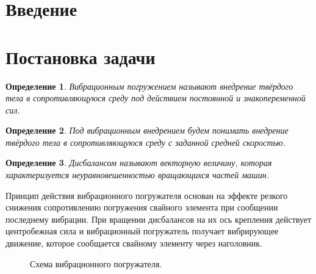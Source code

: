 \documentclass[14pt, a4paper]{extarticle}
\newtheorem{definition}{Определение}
\begin{document}
    \renewcommand\contentsname{Оглавление} %
    \tableofcontents
    \setcounter{page}{2}

    \pagebreak
    \section*{Введение}


    \clearpage
    \section{Постановка задачи}
    \begin{definition}
        Вибрационным погружением называют внедрение твёрдого тела в сопротивляющуюся среду под действием постоянной и знакопеременной сил.
    \end{definition}
    
    \begin{definition}
        Под вибрационным внедрением будем понимать внедрение твёрдого тела в сопротивляющуюся среду с заданной средней скоростью.
    \end{definition}

    \begin{definition}
        Дисбалансом называют векторную величину, которая характеризуется неуравновешенностью вращающихся частей машин.
    \end{definition}
    
    Принцип действия вибрационного погружателя основан на эффекте резкого снижения сопротивлению погружения свайного элемента при сообщении последнему вибрации. При вращении дисбалансов на их ось крепления действует центробежная сила и вибрационный погружатель получает вибрирующее движение, которое сообщается свайному элементу через наголовник.

    \begin{figure}[h]
        \centering
        \caption{Схема вибрационного погружателя.}
        \label{fig:scheme_porg}
    \end{figure}
\end{document}
